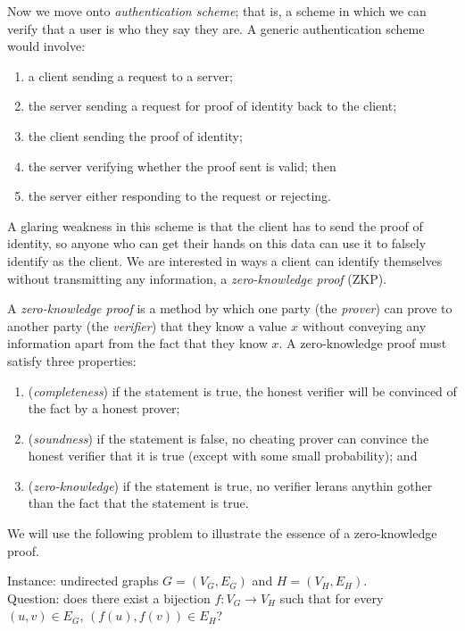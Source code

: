 Now we move onto \emph{authentication scheme}; that is,
a scheme in which we can verify that a user is who they say they are.
A generic authentication scheme would involve:
\begin{enumerate}
	\item a client sending a request to a server;
	\item the server sending a request for proof of identity back to the
		client;
	\item the client sending the proof of identity;
	\item the server verifying whether the proof sent is valid; then
	\item the server either responding to the request or rejecting.
\end{enumerate}

A glaring weakness in this scheme is that the client has to send the proof
of identity, so anyone who can get their hands on this data can use it to
falsely identify as the client.
We are interested in ways a client can identify themselves without
transmitting any information, a \emph{zero-knowledge proof} (ZKP).

\begin{definition}
	A \emph{zero-knowledge proof} is a method by which one party
	(the \emph{prover}) can prove to another party (the \emph{verifier})
	that they know a value $x$ without conveying any information apart
	from the fact that they know $x$.
	A zero-knowledge proof must satisfy three properties:
	\begin{enumerate}
		\item (\emph{completeness}) if the statement is true, the honest 
			verifier will be convinced of the fact by a honest prover;

		\item (\emph{soundness}) if the statement is false, no cheating
			prover can convince the honest verifier that it is true
			(except with some small probability); and

		\item (\emph{zero-knowledge}) if the statement is true, no verifier
			lerans anythin gother than the fact that the statement is true.
	\end{enumerate}
\end{definition}

We will use the following problem to illustrate the essence of a zero-knowledge
proof.

\begin{problem}
	Instance: undirected graphs $G = (V_G, E_G)$ and $H = (V_H, E_H)$. \\
	Question: does there exist a bijection $f: V_G \to V_H$ such that for every
	$(u,v) \in E_G$, $(f(u), f(v)) \in E_H$?
\end{problem}


